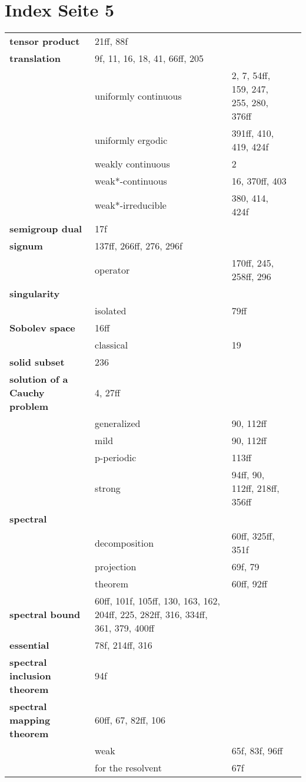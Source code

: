 \documentclass[10pt]{scrartcl}
\begin{document}
\pagestyle{empty}
\section*{Index Seite 5 }
\begin{longtable}{>{\bfseries}p{4cm}p{4cm}p{4cm}p{4cm}}

tensor product 	&  21ff, 88f \\
translation 	&  9f, 11, 16, 18, 41, 66ff, 205 \\
	& uniformly continuous 	&  2, 7, 54ff, 159, 247, 255, 280, 376ff \\
	& uniformly ergodic 	&  391ff, 410, 419, 424f \\
	& weakly continuous 	&  2 \\
	& weak*-continuous 	&  16, 370ff, 403 \\
	& weak*-irreducible 	&  380, 414, 424f \\
semigroup dual 	&  17f \\
signum 	&  137ff, 266ff, 276, 296f \\
	& operator 	&  170ff, 245, 258ff, 296 \\
singularity 	&  \\
	& isolated 	&  79ff \\
Sobolev space 	&  16ff \\
	& classical 	&  19 \\
solid subset 	&  236 \\
solution of a Cauchy problem 	&  4, 27ff \\
	& generalized 	&  90, 112ff \\
	& mild 	&  90, 112ff \\
	& p-periodic 	&  113ff \\
	& strong 	&  94ff, 90, 112ff, 218ff, 356ff \\
spectral 	&  \\
	& decomposition 	&  60ff, 325ff, 351f \\
	& projection 	&  69f, 79 \\
	& theorem 	&  60ff, 92ff \\
spectral bound 	&  60ff, 101f, 105ff, 130, 163, 162, 204ff, 225, 282ff, 316, 334ff, 361, 379, 400ff \\
essential 	&  78f, 214ff, 316 \\
spectral inclusion theorem 	&  94f \\
spectral mapping theorem 	&  60ff, 67, 82ff, 106 \\
	& weak 	&  65f, 83f, 96ff \\
	& for the resolvent 	&  67f \\

\end{longtable}
\end{document}
